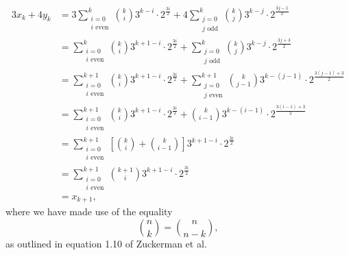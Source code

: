 \documentclass[12 pt]{amsart}
\begin{document}
  \begin{align*}
    3x_k + 4y_k 
    &=
      3
      \sum_{\substack{i = 0 \\ \text{$i$ even}}}^k
        \binom{k}{i}
        3^{k-i}
        \cdot
        2^{\frac{3i}{2}}
      +
      4
      \sum_{\substack{j = 0 \\ \text{$j$ odd}}}^k
        \binom{k}{j}
        3^{k-j}
        \cdot
        2^{\frac{3j-1}{2}} \\
    &=
      \sum_{\substack{i = 0 \\ \text{$i$ even}}}^k
        \binom{k}{i}
        3^{k+1-i}
        \cdot
        2^{\frac{3i}{2}}
      +
      \sum_{\substack{j = 0 \\ \text{$j$ odd}}}^k
        \binom{k}{j}
        3^{k-j}
        \cdot
        2^{\frac{3j+3}{2}} \\
    &=
      \sum_{\substack{i = 0 \\ \text{$i$ even}}}^{k+1}
        \binom{k}{i}
        3^{k+1-i}
        \cdot
        2^{\frac{3i}{2}}
      +
      \sum_{\substack{j = 0 \\ \text{$j$ even}}}^{k+1}
        \binom{k}{j-1}
        3^{k-(j-1)}
        \cdot
        2^{\frac{3(j-1)+3}{2}} \\
    &=
        \sum_{\substack{i = 0 \\ \text{$i$ even}}}^{k+1}
        \binom{k}{i}
        3^{k+1-i}
        \cdot
        2^{\frac{3i}{2}}
        + 
        \binom{k}{i-1}
        3^{k-(i-1)}
        \cdot
        2^{\frac{3(i-1)+3}{2}} \\
    &=
        \sum_{\substack{i = 0 \\ \text{$i$ even}}}^{k+1}
        \left[
          \binom{k}{i}
          +
          \binom{k}{i-1}
        \right]
        3^{k+1-i}
        \cdot
        2^{\frac{3i}{2}} \\
    &=
        \sum_{\substack{i = 0 \\ \text{$i$ even}}}^{k+1}
        \binom{k+1}{i}
        3^{k+1-i}
        \cdot
        2^{\frac{3i}{2}} \\
    &=
        x_{k+1},
  \end{align*}
  where we have made use of the equality
  \[
    \binom{n}{k} = \binom{n}{n-k},
  \]
  as outlined in equation 1.10 of Zuckerman et al.
\end{document}
